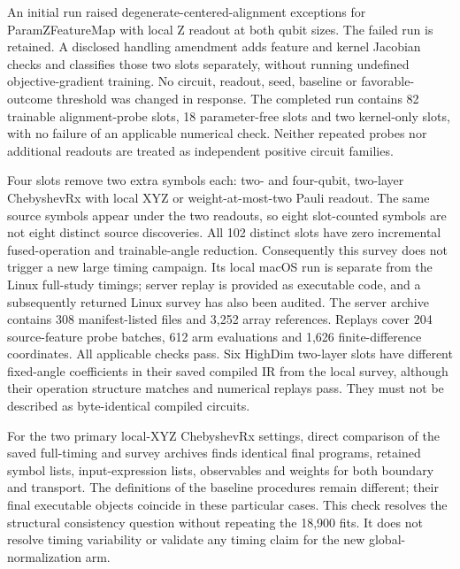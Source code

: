 An initial run raised degenerate-centered-alignment exceptions for
ParamZFeatureMap with local Z readout at both qubit sizes. The failed
run is retained. A disclosed handling amendment adds feature and kernel
Jacobian checks and classifies those two slots separately, without
running undefined objective-gradient training. No circuit, readout,
seed, baseline or favorable-outcome threshold was changed in response.
The completed run contains 82 trainable alignment-probe slots, 18
parameter-free slots and two kernel-only slots, with no failure of
an applicable numerical check. Neither repeated probes nor additional
readouts are treated as independent positive circuit families.

Four slots remove two extra symbols each: two- and four-qubit,
two-layer ChebyshevRx with local XYZ or weight-at-most-two Pauli
readout. The same source symbols appear under the two readouts, so
eight slot-counted symbols are not eight distinct source discoveries.
All 102 distinct slots have zero incremental fused-operation and
trainable-angle reduction. Consequently this survey does not trigger
a new large timing campaign. Its local macOS run is separate from the
Linux full-study timings; server replay is provided as executable code,
and a subsequently returned Linux survey has also been audited.
The server archive contains 308 manifest-listed files and 3,252 array
references. Replays cover 204 source-feature probe batches, 612 arm
evaluations and 1,626 finite-difference coordinates. All applicable
checks pass. Six HighDim two-layer slots have different fixed-angle
coefficients in their saved compiled IR from the local survey, although
their operation structure matches and numerical replays pass. They
must not be described as byte-identical compiled circuits.

For the two primary local-XYZ ChebyshevRx settings, direct comparison
of the saved full-timing and survey archives finds identical final
programs, retained symbol lists, input-expression lists, observables
and weights for both boundary and transport. The definitions of the
baseline procedures remain different; their final executable objects
coincide in these particular cases. This check resolves the structural
consistency question without repeating the 18,900 fits. It does not
resolve timing variability or validate any timing claim for the new
global-normalization arm.

